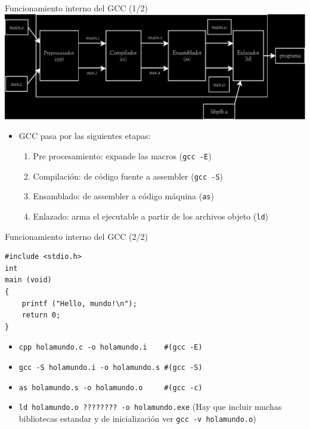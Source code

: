\documentclass[xetex]{beamer}
\begin{document}
\begin{frame}[fragile]{Funcionamiento interno del GCC (1/2)}
\includegraphics[width=\textwidth]{compilation_stagesI.pdf}
\begin{itemize}
  \item GCC pasa por las siguientes etapas:
\begin{enumerate}
  \item Pre procesamiento: expande las macros (\verb=gcc -E=)
  \item Compilación: de código fuente a assembler (\verb=gcc -S=)
  \item Ensamblado: de assembler a código máquina (\verb=as=)
  \item Enlazado: arma el ejecutable a partir de los archivos objeto (\verb=ld=)
\end{enumerate}
\end{itemize}
\end{frame}

\begin{frame}[fragile]{Funcionamiento interno del GCC (2/2)}
  
\begin{lstlisting}
#include <stdio.h>
int
main (void)
{
    printf ("Hello, mundo!\n");
    return 0;
}
\end{lstlisting}

\begin{itemize}
  \item \verb=cpp holamundo.c -o holamundo.i    #(gcc -E)=
  \item \verb=gcc -S holamundo.i -o holamundo.s #(gcc -S)=  
  \item \verb=as holamundo.s -o holamundo.o     #(gcc -c)=
  \item \verb=ld holamundo.o ???????? -o holamundo.exe=
(Hay que incluir muchas bibliotecas estandar y de inicialización ver \verb=gcc -v holamundo.o=)
\end{itemize}
  
\end{frame}
\end{document}
